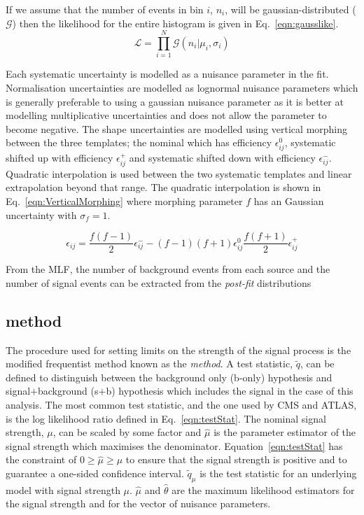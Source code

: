 If we assume that the number of events in bin $i$, $n_{i}$, will be gaussian-distributed ($\mathcal{G}$) then the likelihood for the entire histogram is given in Eq.~\ref{eqn:gausslike}.
\begin{equation}
\mathcal{L} = \prod_{i=1}^{N} \mathcal{G}\left(n_{i}|\mu_{i},\sigma_{i}\right)
\label{eqn:gausslike}
\end{equation}

Each systematic uncertainty is modelled as a nuisance parameter in the fit. Normalisation uncertainties are modelled as lognormal nuisance parameters which is generally preferable to using a gaussian nuisance parameter as it is better at modelling multiplicative uncertainties and does not allow the parameter to become negative. The shape uncertainties are modelled using vertical morphing between the three templates; the nominal which has efficiency $\epsilon_{ij}^{0}$, systematic shifted up with efficiency $\epsilon_{ij}^{+}$ and systematic shifted down with efficiency $\epsilon_{ij}^{-}$. Quadratic interpolation is used between the two systematic templates and linear extrapolation beyond that range. The quadratic interpolation is shown in Eq.~\ref{eqn:VerticalMorphing} where morphing parameter $f$ has an Gaussian uncertainty with $\sigma_{f}=1$.

\begin{equation}
\epsilon_{ij} = \frac{f\left(f-1\right)}{2}\epsilon_{ij}^{-} - \left(f-1\right)\left(f+1\right) \epsilon_{ij}^{0}  \frac{f\left(f+1\right)}{2}\epsilon_{ij}^{+}
\label{eqn:VerticalMorphing}
\end{equation}

From the MLF, the number of background events from each source and the number of signal events can be extracted from the \emph{post-fit} distributions

\subsection{\CLS method}

The procedure used for setting limits on the strength of the signal process is the modified frequentist method known as the \emph{\CLS method}.
A test statistic, $\tilde{q}$, can be defined to distinguish between the background only (b-only) hypothesis and signal$+$background (s$+$b) hypothesis which includes the \tttt signal in the case of this analysis. The most common test statistic, and the one used by CMS and ATLAS, is the log likelihood ratio defined in Eq.~\ref{eqn:testStat}. The nominal signal strength, $\mu$, can be scaled by some factor and $\hat{\mu}$ is the parameter estimator of the signal strength which maximises the denominator. Equation~\ref{eqn:testStat} has the constraint of $0\geq \hat{\mu}\geq \mu$ to ensure that the signal strength is positive and to guarantee a one-sided confidence interval. $\tilde{q}_{\mu}$ is the test statistic for an underlying model with signal strength $\mu$. $\hat{\mu}$ and $\hat{\theta}$ are the maximum likelihood estimators for the signal strength and for the vector of nuisance parameters.

